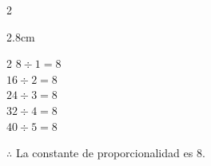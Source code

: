 \begin{multicols}{2}
\begin{parts}
\begin{minipage}[b]{0.6\linewidth}
\begin{solutionbox}{2.8cm}
                        \begin{multicols}{2}
                            $ 8 \div 1=8$\\[-0.2em]
                            $ 16\div 2=8$\\[-0.2em]
                            $ 24\div 3=8$\\[-0.2em]
                            $ 32\div 4=8$\\[-0.2em]
                            $ 40\div 5=8$

                            \columnbreak%

                            $\therefore$ La constante de proporcionalidad es 8.
                        \end{multicols}
                    \end{solutionbox}
                \end{minipage}
            \end{parts}
        \end{multicols}
    